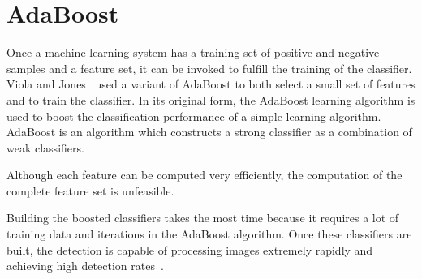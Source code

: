 \documentclass{article}
\begin{document}
\section{AdaBoost}
Once a machine learning system has a training set of positive and negative samples and a feature set, it can be invoked to fulfill the training of the classifier. Viola and Jones~\cite{viola2001rapid} used a variant of AdaBoost to both select a small set of features and to train the classifier. In its original form, the AdaBoost learning algorithm is used to boost the classification performance of a simple learning algorithm. AdaBoost is an algorithm which constructs a strong classifier as a combination of weak classifiers.
\par
Although each feature can be computed very efficiently, the computation of the complete feature set is unfeasible.
\par
Building the boosted classifiers takes the most time because it requires a lot of training data and iterations in the AdaBoost algorithm. Once these classifiers are built, the detection is capable of processing images extremely rapidly and achieving high detection rates~\cite{viola2001rapid}.
\end{document}
